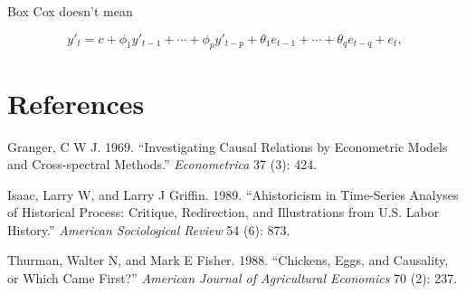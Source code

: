 Box Cox doesn't mean

\begin{equation}\tag{8.1}\label{eq-8-arima} y'_{t} = c +
\phi_{1}y'_{t-1} + \cdots + \phi_{p}y'_{t-p} +
\theta_{1}e_{t-1} + \cdots + \theta_{q}e_{t-q} + e_{t},
\end{equation}

\section*{References}\label{references}

\hypertarget{refs}{}
\hypertarget{ref-Granger:1969wx}{}
Granger, C W J. 1969. ``Investigating Causal Relations by Econometric
Models and Cross-spectral Methods.'' \emph{Econometrica} 37 (3): 424.

\hypertarget{ref-Isaac:1989hp}{}
Isaac, Larry W, and Larry J Griffin. 1989. ``Ahistoricism in Time-Series
Analyses of Historical Process: Critique, Redirection, and Illustrations
from U.S. Labor History.'' \emph{American Sociological Review} 54 (6):
873.

\hypertarget{ref-Thurman:1988va}{}
Thurman, Walter N, and Mark E Fisher. 1988. ``Chickens, Eggs, and
Causality, or Which Came First?'' \emph{American Journal of Agricultural
Economics} 70 (2): 237.
